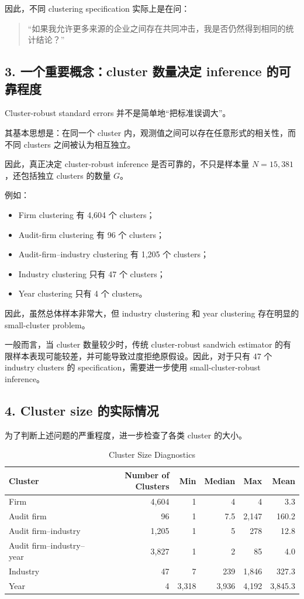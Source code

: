 \documentclass[11pt]{article}
\begin{document}
因此，不同 clustering specification 实际上是在问：

\begin{quote}
“如果我允许更多来源的企业之间存在共同冲击，我是否仍然得到相同的统计结论？”
\end{quote}

\subsection{3. 一个重要概念：cluster 数量决定 inference 的可靠程度}

Cluster-robust standard errors 并不是简单地“把标准误调大”。

其基本思想是：在同一个 cluster 内，观测值之间可以存在任意形式的相关性，而不同 clusters 之间被认为相互独立。

因此，真正决定 cluster-robust inference 是否可靠的，不只是样本量 $N=15,381$，还包括独立 clusters 的数量 $G$。

例如：

\begin{itemize}
    \item Firm clustering 有 4,604 个 clusters；
    \item Audit-firm clustering 有 96 个 clusters；
    \item Audit-firm--industry clustering 有 1,205 个 clusters；
    \item Industry clustering 只有 47 个 clusters；
    \item Year clustering 只有 4 个 clusters。
\end{itemize}

因此，虽然总体样本非常大，但 industry clustering 和 year clustering 存在明显的 small-cluster problem。

一般而言，当 cluster 数量较少时，传统 cluster-robust sandwich estimator 的有限样本表现可能较差，并可能导致过度拒绝原假设。因此，对于只有 47 个 industry clusters 的 specification，需要进一步使用 small-cluster-robust inference。

\subsection{4. Cluster size 的实际情况}

为了判断上述问题的严重程度，进一步检查了各类 cluster 的大小。

\begin{table}[htbp]
\centering
\caption{Cluster Size Diagnostics}
\begin{tabular}{lrrrrr}
\toprule
Cluster & Number of Clusters & Min & Median & Max & Mean \\
\midrule
Firm & 4,604 & 1 & 4 & 4 & 3.3 \\
Audit firm & 96 & 1 & 7.5 & 2,147 & 160.2 \\
Audit firm--industry & 1,205 & 1 & 5 & 278 & 12.8 \\
Audit firm--industry--year & 3,827 & 1 & 2 & 85 & 4.0 \\
Industry & 47 & 7 & 239 & 1,846 & 327.3 \\
Year & 4 & 3,318 & 3,936 & 4,192 & 3,845.3 \\
\bottomrule
\end{tabular}
\end{table}
\end{document}
